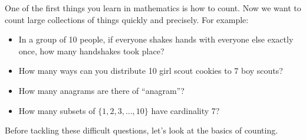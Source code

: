 \documentclass[12pt]{article}
\begin{document}
One of the first things you learn in mathematics is how to count.  Now we want to count large collections of things quickly and precisely.  For example:
\begin{itemize}
 \item In a group of 10 people, if everyone shakes hands with everyone else exactly once, how many handshakes took place? %
 \item How many ways can you distribute 10 girl scout cookies to 7 boy scouts?
 \item How many anagrams are there of ``anagram''?
 \item How many subsets of $\{1,2,3,\ldots, 10\}$ have cardinality 7?
\end{itemize}

Before tackling these difficult questions, let's look at the basics of counting.
\end{document}
